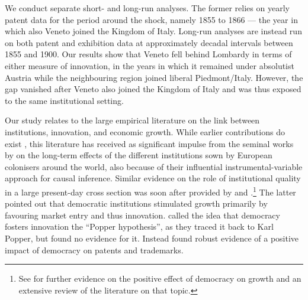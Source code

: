 We conduct separate short- and long-run analyses. The former relies on yearly patent data for the period around the shock, namely 1855 to 1866 --- the year in which also Veneto joined the Kingdom of Italy. Long-run analyses are instead run on both patent and exhibition data at approximately decadal intervals between 1855 and 1900. %
Our results show that Veneto fell behind Lombardy in terms of either measure of innovation, in the years in which it remained under absolutist Austria while the neighbouring region joined liberal Piedmont/Italy. However, the gap vanished after Veneto also joined the Kingdom of Italy and was thus exposed to the same institutional setting.  


Our study relates to the large empirical literature on the link between institutions, innovation, and economic growth. While earlier contributions do exist \citep[for instance,][show a negative association between absolutist rule and city growth in the pre-industrial era]{delong1993}, this literature has received as significant impulse from the seminal works by \citet{acemoglu2001, acemoglu2002} on the long-term effects of the different institutions sown by European colonisers around the world, also because of their influential instrumental-variable approach for causal inference. 
Similar evidence on the role of institutional quality in a large present-day cross section was soon after provided by \citet{rodrik2004} and \citet{aghion2007}.\footnote{See \citet{acemoglu2019} for further evidence on the positive effect of democracy on growth and an extensive review of the literature on that topic.
}
The latter pointed out that democratic institutions stimulated growth primarily by favouring market entry and thus innovation. 
\citet{gao2017} called the idea that democracy fosters innovation the ``Popper hypothesis'', as they traced it back to Karl Popper, but found no evidence for it. 
Instead \citet{wang2021} found robust evidence of a positive impact of democracy on patents and trademarks. 

